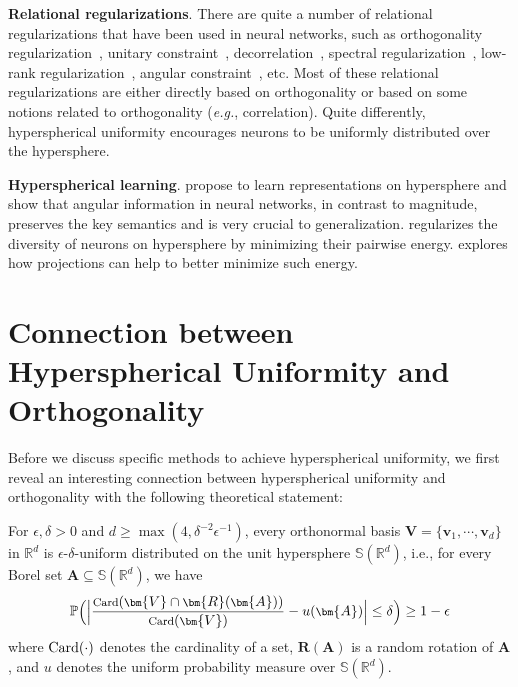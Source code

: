 \textbf{Relational regularizations}. There are quite a number of relational regularizations that have been used in neural networks, such as orthogonality regularization~\cite{bansal2018can,liu2017hyper,rodriguez2016regularizing,huang2018orthogonal,choromanski2018initialization}, unitary constraint~\cite{jing2017tunable,wisdom2016full,arjovsky2016unitary},  decorrelation~\cite{rodriguez2016regularizing,cogswell2015reducing,xie2017uncorrelation}, spectral regularization~\cite{yoshida2017spectral}, low-rank regularization~\cite{tai2015convolutional}, angular constraint~\cite{xie2017learning,li2017improving}, etc. Most of these relational regularizations are either directly based on orthogonality or based on some notions related to orthogonality (\emph{e.g.}, correlation). Quite differently, hyperspherical uniformity encourages neurons to be uniformly distributed over the hypersphere.

\textbf{Hyperspherical learning}.\! \cite{liu2016large,liu2017hyper,liu2018decoupled,LiuNIPS19,liu2017sphereface,wang2018cosface,wang2018additive,deng2019arcface,davidson2018hyperspherical,park2019sphere,Chen20AVH,Liu2020OPT} propose to learn representations on hypersphere and show that angular information in neural networks, in contrast to magnitude, preserves the key semantics and is very crucial to generalization. \cite{liu2018learning} regularizes the diversity of neurons on hypersphere by minimizing their pairwise energy. \cite{Lin20CoMHE} explores how projections can help to better minimize such energy.

\section{Connection between Hyperspherical Uniformity and Orthogonality}

Before we discuss specific methods to achieve hyperspherical uniformity, we first reveal an interesting connection between hyperspherical uniformity and orthogonality with the following theoretical statement:

\begin{theorem}\label{ortho_uniform}
For $\epsilon,\delta>0$ and $d\geq \max(4,\delta^{-2}\epsilon^{-1})$, every orthonormal basis $\bm{V}=\{\bm{v}_1,\cdots,\bm{v}_d\}$ in $\mathbb{R}^d$ is $\epsilon$-$\delta$-uniform distributed on the unit hypersphere $\mathbb{S}(\mathbb{R}^d)$, i.e., for every Borel set $\bm{A}\subseteq\mathbb{S}(\mathbb{R}^d)$, we have
\begin{equation}
\footnotesize
    \mathbb{P}\bigg(\bigg{|}\frac{\textnormal{Card}(\bm{V}\cap\bm{R}(\bm{A}))}{\textnormal{Card}(\bm{V})}-u(\bm{A})\bigg{|}\leq\delta\bigg)\geq 1-\epsilon
\end{equation}
where $\textnormal{Card}(\cdot)$ denotes the cardinality of a set, $\bm{R}(\bm{A})$ is a random rotation of $\bm{A}$, and $u$ denotes the uniform probability measure over $\mathbb{S}(\mathbb{R}^d)$.
\end{theorem}

